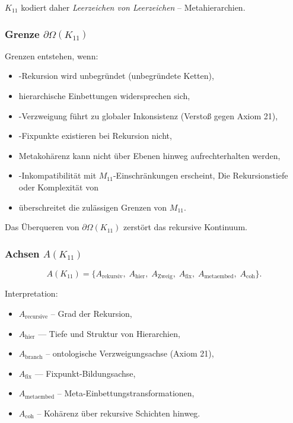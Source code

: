 $K_{11}$ kodiert daher \emph{Leerzeichen von Leerzeichen} – Metahierarchien.

\subsubsection{Grenze $\partial\Omega(K_{11})$}

Grenzen entstehen, wenn:
\begin{itemize}
    \item-Rekursion wird unbegründet (unbegründete Ketten),
    \item hierarchische Einbettungen widersprechen sich,
    \item-Verzweigung führt zu globaler Inkonsistenz (Verstoß gegen Axiom 21),
    \item-Fixpunkte existieren bei Rekursion nicht,
    \item Metakohärenz kann nicht über Ebenen hinweg aufrechterhalten werden,
    \item-Inkompatibilität mit $M_{11}$-Einschränkungen erscheint,
    Die Rekursionstiefe oder Komplexität von \item überschreitet die zulässigen Grenzen von $M_{11}$.
\end{itemize}

Das Überqueren von $\partial\Omega(K_{11})$ zerstört das rekursive Kontinuum.

\subsubsection{Achsen $A(K_{11})$}

\[
A(K_{11}) =
\{
A_{\mathrm{rekursiv}},\;
A_{\mathrm{hier}},\;
A_{\mathrm{Zweig}},\;
A_{\mathrm{fix}},\;
A_{\mathrm{metaembed}},\;
A_{\mathrm{coh}}
\}.
\]

Interpretation:
\begin{itemize}
    \item $A_{\mathrm{recursive}}$ – Grad der Rekursion,
    \item $A_{\mathrm{hier}}$ — Tiefe und Struktur von Hierarchien,
    \item $A_{\mathrm{branch}}$ – ontologische Verzweigungsachse (Axiom 21),
    \item $A_{\mathrm{fix}}$ — Fixpunkt-Bildungsachse,
    \item $A_{\mathrm{metaembed}}$ – Meta-Einbettungstransformationen,
    \item $A_{\mathrm{coh}}$ – Kohärenz über rekursive Schichten hinweg.
\end{itemize}

